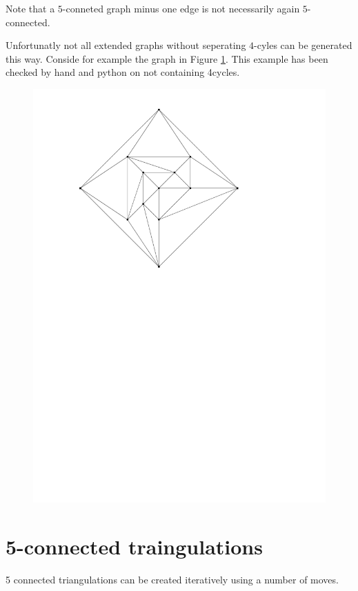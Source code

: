 Note that a $5$-conneted graph minus one edge is not necessarily again $5$-connected.

Unfortunatly not all extended graphs without seperating $4$-cyles can be generated this way. Conside for example the graph in Figure \ref{fig:ure}. This example has been checked by hand and python on not containing 4cycles.

\begin{figure}[h]
  \centering
  \includegraphics[scale=1]{NoSeperating4CycleButAdddingEdgeBackInIsBad.pdf}
  \caption{}
  \label{fig:ure}
\end{figure}

\section{5-connected traingulations}
5 connected triangulations can be created iteratively using a number of moves.



